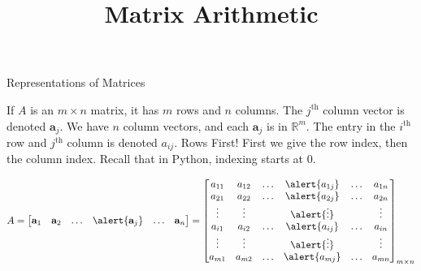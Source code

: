 \documentclass[xcolor=dvipsnames,aspectratio=169,t]{beamer}
\title{Matrix Arithmetic}
\begin{document}
\maketitle

\begin{frame}{Representations of Matrices}

\bi 
\ii If $A$ is an $m \times n$ matrix, it has $m$ rows and $n$ columns.
\ii The $j^{\mbox{th}}$ column vector is denoted $\mathbf{a}_j$.
\ii We have $n$ column vectors, and each $\mathbf{a}_j$ is in $\mathbb{R}^m$.
\ii The entry in the $i^{\mbox{th}}$ row and $j^{\mbox{th}}$ column is denoted $a_{ij}$.
\ii \alert{Rows First!}  First we give the row index, then the column index.
\ii \alert{Recall that in Python, indexing starts at 0.}
\ei

\[ A = \begin{bmatrix} \mathbf{a}_1 &  \mathbf{a}_2 & \ldots & \alert{\mathbf{a}_j} & \ldots & \mathbf{a}_n \end{bmatrix} = 
\begin{bmatrix}
a_{11} & a_{12} & \ldots & \alert{a_{1j}} & \ldots & a_{1n} \\
a_{21} & a_{22} & \ldots & \alert{a_{2j}} & \ldots & a_{2n} \\
\vdots & \vdots & & \alert{\vdots} & & \vdots \\
a_{i1} & a_{i2} & \ldots & \alert{a_{ij}} & \ldots & a_{in} \\
\vdots & \vdots & & \alert{\vdots} && \vdots \\
a_{m1} & a_{m2} & \ldots & \alert{a_{mj}} & \ldots & a_{mn} 
\end{bmatrix}_{m\times n} \]

\end{frame}
\end{document}
